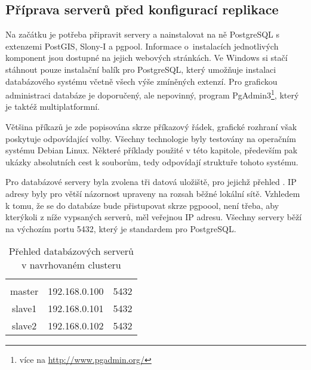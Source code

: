       \subsection{Příprava serverů před konfigurací replikace}
      \label{kPriprava}
      Na začátku je potřeba připravit servery a nainstalovat na ně PostgreSQL s extenzemi PostGIS, Slony-I a pgpool. Informace o~instalacích jednotlivých komponent jsou dostupné na jejich webových stránkách. Ve Windows si stačí stáhnout pouze instalační balík pro PostgreSQL, který umožňuje instalaci databázového systému včetně všech výše zmíněných extenzí. Pro grafickou administraci databáze je doporučený, ale nepovinný, program \mbox{PgAdmin3}\footnote{více na \url{http://www.pgadmin.org/}}, který je taktéž multiplatformní. 
      
      Většina příkazů je zde popisována skrze příkazový řádek, grafické rozhraní však poskytuje odpovídající volby. Všechny technologie byly testovány na operačním systému Debian Linux. Některé příklady použité v této kapitole, především pak ukázky absolutních cest k souborům, tedy odpovídají struktuře tohoto systému.

Pro databázové servery byla zvolena tři datová uložiště, pro jejichž přehled . IP adresy byly pro větší názornost upraveny na rozsah běžné lokální sítě. Vzhledem k tomu, že se do databáze bude přistupovat skrze pgpoool, není třeba, aby kterýkoli z níže vypsaných serverů, měl veřejnou IP adresu. Všechny servery běží na výchozím portu 5432, který je standardem pro PostgreSQL.

        \begin{table}[H]
          \caption{Přehled databázových serverů v navrhovaném clusteru}
            \label{tServery}
            \begin{center}
            \begin{tabular}{|ccc|}
              \hline
              \color{purpurova7}{název} & \color{purpurova7}{IP adresa} & \color{purpurova7}{port}\\
                                 master& 192.168.0.100 & 5432\\
                                 slave1& 192.168.0.101 & 5432\\
                                 slave2& 192.168.0.102 & 5432\\
              \hline
              \end{tabular}
            \end{center}
        \end{table}

